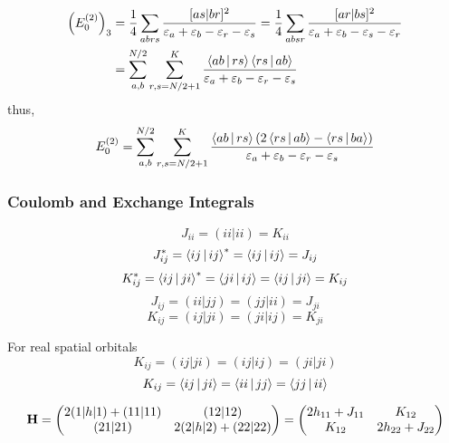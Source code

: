 \documentclass[a4paper]{article}
\begin{document}
\begin{equation}\label{key}
\begin{aligned}
\qty(E_0^{(2)})_3 &= \dfrac{1}{4}\sum_{abrs} \dfrac{[as|br]^2}{\varepsilon_a+\varepsilon_b-\varepsilon_r-\varepsilon_s} = \dfrac{1}{4}\sum_{absr}\dfrac{[ar|bs]^2}{\varepsilon_a+\varepsilon_b-\varepsilon_s-\varepsilon_r}\\
&= \sum_{a,b}^{N/2}\sum_{r,s=N/2+1}^K \dfrac{\Braket{ab|rs}\Braket{rs|ab}}{\varepsilon_a+\varepsilon_b-\varepsilon_r-\varepsilon_s}
\end{aligned}
\end{equation}
thus,
\begin{equation}\label{key}
E_0^{(2)} = \sum_{a,b}^{N/2}\sum_{r,s=N/2+1}^K \dfrac{\Braket{ab|rs}(2\Braket{rs|ab} - \Braket{rs|ba})}{\varepsilon_a+\varepsilon_b-\varepsilon_r-\varepsilon_s}
\end{equation}

\subsubsection{Coulomb and Exchange Integrals}
\begin{equation}\label{key}
J_{ii} = (ii|ii) = K_{ii} 
\end{equation}
\begin{equation}\label{key}
J_{ij}^* = \Braket{ij|ij}^* = \Braket{ij|ij} = J_{ij}
\end{equation}
\begin{equation}\label{key}
K_{ij}^* = \Braket{ij|ji}^* = \Braket{ji|ij} = \Braket{ij|ji} = K_{ij}
\end{equation}
\begin{equation}\label{key}
J_{ij} = (ii|jj) = (jj|ii) = J_{ji}
\end{equation}
\begin{equation}\label{key}
K_{ij} = (ij|ji) = (ji|ij) = K_{ji}
\end{equation}

For real spatial orbitals
\begin{equation}\label{key}
K_{ij} = (ij|ji) = (ij|ij) = (ji|ji)
\end{equation}
\begin{equation}\label{key}
K_{ij} = \Braket{ij|ji} = \Braket{ii|jj} = \Braket{jj|ii}
\end{equation}

\begin{equation}\label{key}
\vb{H} = \mqty(2(1|h|1) + (11|11) & (12|12)\\
(21|21) & 2(2|h|2) + (22|22)) = 
\mqty(2h_{11} + J_{11} & K_{12}\\
      K_{12} & 2h_{22} + J_{22})
\end{equation}
\end{document}
